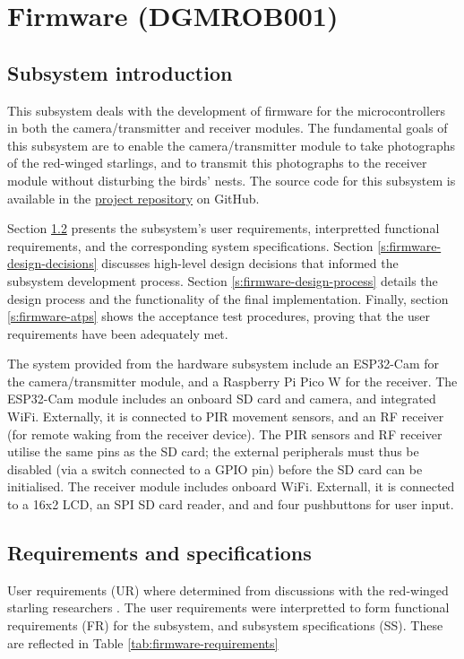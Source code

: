 \documentclass[class=report,11pt,crop=false]{standalone}
\begin{document}
\ifstandalone
\tableofcontents
\fi
\chapter{Firmware (DGMROB001) \label{ch:firmware}}
\section{Subsystem introduction}

This subsystem deals with the development of firmware for the microcontrollers in both the camera/transmitter and receiver modules. The fundamental goals of this subsystem are to enable the camera/transmitter module to take photographs of the red-winged starlings, and to transmit this photographs to the receiver module without disturbing the birds' nests. The source code for this subsystem is available in the \href{https://github.com/rothdu/EEE4113F-Group13-2024}{project repository} on GitHub.

Section \ref{s:firmware-requirements} presents the subsystem's user requirements, interpretted functional requirements, and the corresponding system specifications. Section \ref{s:firmware-design-decisions} discusses high-level design decisions that informed the subsystem development process. Section \ref{s:firmware-design-process} details the design process and the functionality of the final implementation. Finally, section \ref{s:firmware-atps} shows the acceptance test procedures, proving that the user requirements have been adequately met.

The system provided from the hardware subsystem include an ESP32-Cam for the camera/transmitter module, and a Raspberry Pi Pico W for the receiver. The ESP32-Cam module includes an onboard SD card and camera, and integrated WiFi. Externally, it is connected to PIR movement sensors, and an RF receiver (for remote waking from the receiver device). The PIR sensors and RF receiver utilise the same pins as the SD card; the external peripherals must thus be disabled (via a switch connected to a GPIO pin) before the SD card can be initialised. The receiver module includes onboard WiFi. Externall, it is connected to a 16x2 LCD, an SPI SD card reader, and and four pushbuttons for user input.

\section{Requirements and specifications} \label{s:firmware-requirements}
User requirements (UR) where determined from discussions with the red-winged starling researchers \cite{hofmeyer2024private}. The user requirements were interpretted to form functional requirements (FR) for the subsystem, and subsystem specifications (SS). These are reflected in Table \ref{tab:firmware-requirements}
\end{document}
